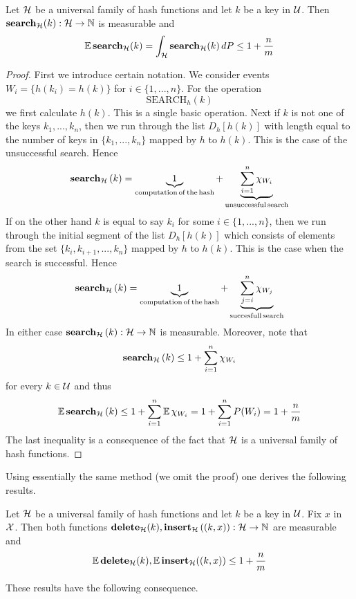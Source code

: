 \begin{theorem}\label{theorem:universal_family_of_hash_functions_expected_cost_for_search}
Let ${\mathcal H}$ be a universal family of hash functions and let $k$ be a key in ${\mathcal U}$. Then $\mathbf{search}_{\mathcal H}(k):{\mathcal H}\rightarrow {\mathbb N}$ is measurable and
$$\mathbb{E}\,\mathbf{search}_{\mathcal H}(k) = \int_{{\mathcal H}}\mathbf{search}_{\mathcal H}(k)\,dP \leq 1 + \frac{n}{m}$$
\end{theorem}
\begin{proof}
First we introduce certain notation. We consider events $W_{i} = \big\{h(k_i) = h(k)\big\}$ for $i\in \{1,...,n\}$. For the operation
$$\mathrm{SEARCH}_h(k)$$
we first calculate $h(k)$. This is a single basic operation. Next if $k$ is not one of the keys $k_1,...,k_n$, then we run through the list $D_h[h(k)]$ with length equal to the number of keys in $\big\{k_1,...,k_n\big\}$ mapped by $h$ to $h(k)$. This is the case of the unsuccessful search. Hence
$$\mathbf{search}_{\mathcal H}\left(k\right) = \underbrace{1}_{\mathrm{computation\,of\,the\,hash}} + \underbrace{\sum_{i=1}^n \chi_{W_{i}}}_{\mathrm{unsuccessful\,search}}$$
If on the other hand $k$ is equal to say $k_i$ for some $i\in \{1,...,n\}$, then we run through the initial segment of the list $D_h[h(k)]$ which consists of elements from the set $\big\{k_i,k_{i+1},...,k_n\big\}$ mapped by $h$ to $h(k)$. This is the case when the search is successful. Hence
$$\mathbf{search}_{\mathcal H}\left(k\right) = \underbrace{1}_{\mathrm{computation\,of\,the\,hash}} + \underbrace{\sum_{j = i}^n \chi_{W_{j}}}_{\mathrm{succesfull\,search}}$$
In either case $\mathbf{search}_{\mathcal H}\left(k\right):{\mathcal H}\rightarrow {\mathbb N}$ is measurable. Moreover, note that
$$\mathbf{search}_{{\mathcal H}}\left(k\right) \leq 1 + \sum_{i=1}^n \chi_{W_{i}}$$
for every $k\in {\mathcal U}$ and thus
$$\mathbb{E}\,\mathbf{search}_{\mathcal H}\left(k\right) \leq 1 +  \sum_{i=1}^n \mathbb{E}\,\chi_{W_{i}} = 1 + \sum_{i=1}^nP(W_i) =  1 + \frac{n}{m}$$
The last inequality is a consequence of the fact that ${\mathcal H}$ is a universal family of hash functions.
\end{proof}
\noindent
Using essentially the same method (we omit the proof) one derives the following results.

\begin{theorem}\label{theorem:universal_family_of_hash_functions_expected_costs_of_delete_and_insert}
Let ${\mathcal H}$ be a universal family of hash functions and let $k$ be a key in ${\mathcal U}$. Fix $x$ in ${\mathcal X}$. Then both functions $\mathbf{delete}_{\mathcal H}(k),\mathbf{insert}_{\mathcal H}\left((k,x)\right):{\mathcal H}\rightarrow {\mathbb N}$ are measurable and
$$\mathbb{E}\,\mathbf{delete}_{\mathcal H}(k), \mathbb{E}\,\mathbf{insert}_{\mathcal H}((k,x))  \leq 1 + \frac{n}{m}$$
\end{theorem}
\noindent
These results have the following consequence.

